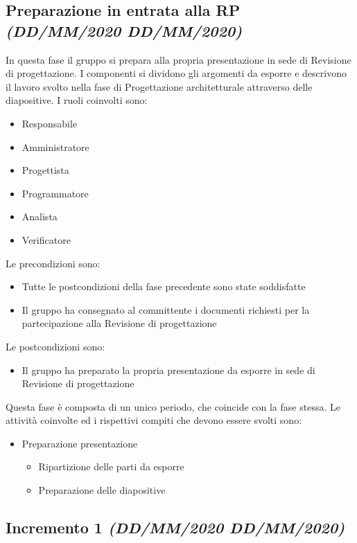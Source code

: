 \documentclass[../piano-di-progetto.tex]{subfiles}
\begin{document}
\subsection[Preparazione in entrata alla RP]{Preparazione in entrata alla RP {\normalsize\normalfont\itshape(DD/MM/2020  DD/MM/2020)}}%
\label{sub:preparazione_in_entrata_alla_rp}
In questa fase il gruppo si prepara alla propria presentazione in sede di Revisione di progettazione.
I componenti si dividono gli argomenti da esporre e descrivono il lavoro svolto nella fase di Progettazione architetturale attraverso delle diapositive.
I ruoli coinvolti sono:
\begin{itemize}
  \item Responsabile
  \item Amministratore
  \item Progettista
  \item Programmatore
  \item Analista
  \item Verificatore
\end{itemize}
Le precondizioni sono:
\begin{itemize}
  \item Tutte le postcondizioni della fase precedente sono state soddisfatte
  \item Il gruppo ha consegnato al committente i documenti richiesti per la partecipazione alla Revisione di progettazione
\end{itemize}
Le postcondizioni sono:
\begin{itemize}
  \item Il gruppo ha preparato la propria presentazione da esporre in sede di Revisione di progettazione
\end{itemize}
Questa fase è composta di un unico periodo, che coincide con la fase stessa.
Le attività coinvolte ed i rispettivi compiti che devono essere svolti sono:
\begin{itemize}
  \item Preparazione presentazione
  \begin{itemize}
    \item Ripartizione delle parti da esporre
    \item Preparazione delle diapositive
  \end{itemize}
\end{itemize}
\subsection[Incremento 1]{Incremento 1 {\normalsize\normalfont\itshape(DD/MM/2020  DD/MM/2020)}}%
\label{sub:incremento_1}
\end{document}
